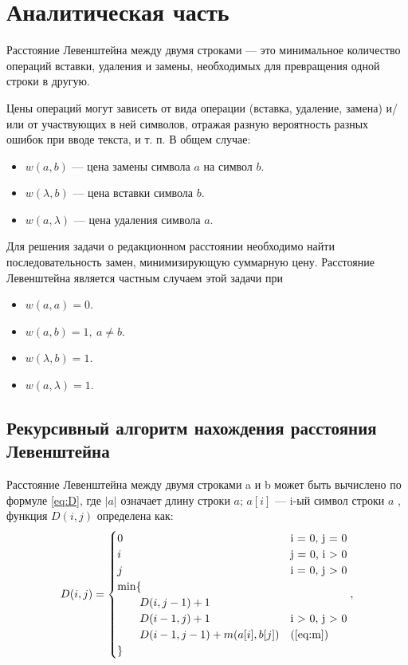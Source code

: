 \chapter{Аналитическая часть}

Расстояние Левенштейна \cite{Levenshtein} между двумя строками — это минимальное количество операций вставки, удаления и замены, необходимых для превращения одной строки в другую.

Цены операций могут зависеть от вида операции (вставка, удаление, замена) и/или от участвующих в ней символов, отражая разную вероятность разных ошибок при вводе текста, и т. п. В общем случае:
\begin{itemize}
	\item $w(a,b)$ — цена замены символа $a$ на символ $b$.
	\item $w(\lambda,b)$ — цена вставки символа $b$.
	\item $w(a,\lambda)$ — цена удаления символа $a$.
\end{itemize}

Для решения задачи о редакционном расстоянии необходимо найти последовательность замен, минимизирующую суммарную цену. Расстояние Левенштейна является частным случаем этой задачи при
\begin{itemize}
	\item $w(a,a)=0$.
	\item $w(a,b)=1, \medspace a \neq b$.
	\item $w(\lambda,b)=1$.
	\item $w(a,\lambda)=1$.
\end{itemize}

\clearpage

\section{Рекурсивный алгоритм нахождения расстояния Левенштейна}

Расстояние Левенштейна между двумя строками a и b может быть вычислено по формуле \ref{eq:D}, где $|a|$ означает длину строки $a$; $a[i]$ — i-ый символ строки $a$ , функция $D(i, j)$ определена как:
\begin{equation}
	\label{eq:D}
	D(i, j) = \begin{cases}
		0 &\text{i = 0, j = 0}\\
		i &\text{j = 0, i > 0}\\
		j &\text{i = 0, j > 0}\\
		\min \lbrace \\
			\qquad D(i, j-1) + 1\\
			\qquad D(i-1, j) + 1 &\text{i > 0, j > 0}\\
			\qquad D(i-1, j-1) + m(a[i], b[j]) &\text(\ref{eq:m})\\
		\rbrace
	\end{cases},
\end{equation}

